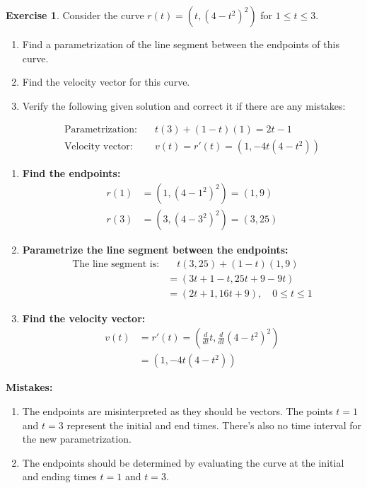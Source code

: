 \documentclass[12pt]{article}
\theoremstyle{plain}
\theoremstyle{definition}
\newtheorem{Ej}[Th]{Exercise}         %
\theoremstyle{remark}
\renewcommand{\leq}{\leqslant}      %
\renewcommand{\:}{\colon}           %
\renewcommand{\.}{\Cdot}                %
\begin{document}
  \begin{Ej}
    Consider the curve $r(t) = (t, (4 - t^2)^2)$ for $1 \leq t \leq 3$. 
    \begin{enumerate}
        \item Find a parametrization of the line segment between the endpoints of this curve.
        \item Find the velocity vector for this curve.
        \item Verify the following given solution and correct it if there are any mistakes:
        \begin{ptcb}
          \begin{align*}
            \text{Parametrization:} & \quad t(3) + (1 - t)(1) = 2t - 1 \\
            \text{Velocity vector:} & \quad v(t) = r'(t) = (1, -4t(4 - t^2))
          \end{align*}
        \end{ptcb}
            
    \end{enumerate}
    \end{Ej}

    \begin{ptcb}
\begin{enumerate}
  \item \textbf{Find the endpoints:}
  \begin{align*}
    r(1) &= (1, (4 - 1^2)^2) = (1, 9) \\
    r(3) &= (3, (4 - 3^2)^2) = (3, 25)
  \end{align*}

  \item \textbf{Parametrize the line segment between the endpoints:}
  \begin{align*}
    \text{The line segment is:} & \quad t(3, 25) + (1 - t)(1, 9) \\
    &= (3t + 1 - t, 25t + 9 - 9t) \\
    &= (2t + 1, 16t + 9), \quad 0 \leq t \leq 1
  \end{align*}

  \item \textbf{Find the velocity vector:}
  \begin{align*}
    v(t) &= r'(t) = \left( \frac{d}{dt} t, \frac{d}{dt} (4 - t^2)^2 \right) \\
    &= (1, -4t(4 - t^2))
  \end{align*}
\end{enumerate}
\textbf{Mistakes:}
\begin{enumerate}
  \item The endpoints are misinterpreted as they should be vectors. The points $t=1$ and $t=3$ represent the initial and end times. There's also no time interval for the new parametrization.
  \item The endpoints should be determined by evaluating the curve at the initial and ending times $t = 1$ and $t = 3$.
\end{enumerate}
    \end{ptcb}
\end{document}
